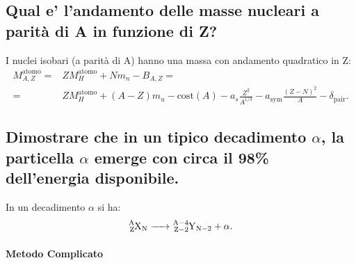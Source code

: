 \subsection[\hspace{2mm} ]{Qual e' l'andamento delle masse nucleari a parità di A in funzione di Z?}
I nuclei isobari (a parità di A) hanno una massa con andamento quadratico in Z:
\begin{align*}
	M_{A,Z}^{\text{atomo}} =& ZM_H^{\text{atomo}} + Nm_n - B_{A,Z} =\\
	=&ZM_H^{\text{atomo}}+\left(A-Z\right)m_u-\text{cost}\left(A\right)-a_s\frac{Z^2}{A^{1/3}}-a_{\text{sym}}\frac{\left(Z-N\right)^2}{A}-\delta_{\text{pair}}
.\end{align*}

\subsection[\hspace{2mm} ]{Dimostrare che in un tipico decadimento $\alpha$, la particella $\alpha$ emerge con circa il 98\% dell'energia disponibile.}
In un decadimento $\alpha$ si ha:
\[
\ce{\ce{^{A}_{Z}X_{N}} -> \ce{^{A-4}_{Z-2}Y_{N-2}} + \alpha}
.\]
\paragraph{Metodo Complicato}%

